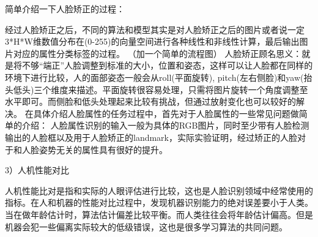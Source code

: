 简单介绍一下人脸矫正的过程：

经过人脸矫正之后，不同的算法和模型其实是对人脸矫正之后的图片或者说一定3*H*W维数值分布在(0-255)的向量空间进行各种线性和非线性计算，最后输出图片对应的属性分类标签的过程。
（加一个简单的流程图）
人脸矫正顾名思义：就是将不够“端正”人脸调整到标准的大小，位置和姿态，这样可以让人脸都在同样的环境下进行比较，人的面部姿态一般会从roll(平面旋转), pitch(左右侧脸)和yaw(抬头低头)三个维度来描述。平面旋转很容易处理，只需将图片旋转一个角度调整至水平即可。而侧脸和低头处理起来比较有挑战，但通过放射变化也可以较好的解决。
在具体介绍人脸属性的任务过程中，首先对于人脸属性的一些常见问题做简单的介绍：
人脸属性识别的输入一般为具体的RGB图片，同时至少带有人脸检测输出的人脸框以及用于人脸矫正的landmark，实际实验证明，经过矫正的人脸对于和人脸姿势无关的属性具有很好的提升。

3）人机性能对比

人机性能比对是指和实际的人眼评估进行比较，这也是人脸识别领域中经常使用的指标。在人和机器的性能对比过程中，发现机器识别能力的绝对误差要小于人类。当在做年龄估计时，算法估计偏差比较平衡。而人类往往会将年龄估计偏高。但是机器会犯一些偏离实际较大的低级错误，这也是很多学习算法的共同问题。
